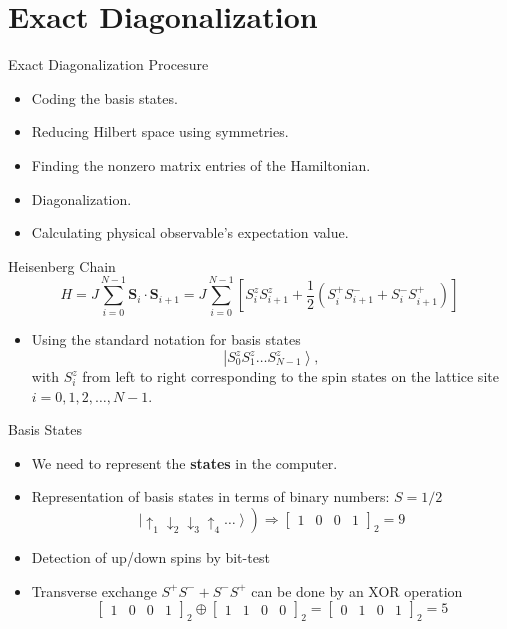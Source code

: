 \documentclass{beamer}
\begin{document}
\section{Exact Diagonalization}
\begin{frame}{Exact Diagonalization Procesure}
    \begin{itemize}
        \item Coding the basis states.
        \item Reducing Hilbert space using symmetries.
        \item Finding the nonzero matrix entries of the Hamiltonian.
        \item Diagonalization.
        \item Calculating physical observable's expectation value.
    \end{itemize}
\end{frame}
\begin{frame}{Heisenberg Chain}
$$
        H=J \sum_{i=0}^{N-1} \mathbf{S}_i \cdot \mathbf{S}_{i+1}=J \sum_{i=0}^{N-1}\left[S_i^z S_{i+1}^z+\frac{1}{2}\left(S_i^{+} S_{i+1}^{-}+S_i^{-} S_{i+1}^{+}\right)\right]
$$
    \begin{itemize}
    \item Using the standard notation for basis states 
    $$
    \left|S_0^z S_1^z \ldots S_{N-1}^z\right\rangle,
    $$
    with $S_i^z$ from left to right corresponding to the spin states on the lattice site $i=0,1,2,\ldots, N-1$.
    \end{itemize}
\end{frame}
\begin{frame}{Basis States}
    \begin{itemize}
        \item We need to represent the \textbf{states} in the computer.
        \item Representation of basis states in terms of binary numbers: $S=1/2$
$$
\left.\left|\uparrow_1 \downarrow_2 \downarrow_3 \uparrow_4 \ldots\right\rangle\right) \Rightarrow\left[\begin{array}{llll}
1 & 0 & 0 & 1
\end{array}\right]_2=9
$$
\item Detection of up/down spins by bit-test
\item Transverse exchange $S^{+} S^{-}+S^{-} S^{+}$ can be done by an XOR operation
$$
\left[\begin{array}{llll}
1 & 0 & 0 & 1
\end{array}\right]_2 \oplus\left[\begin{array}{llll}
1 & 1 & 0 & 0
\end{array}\right]_2=\left[\begin{array}{llll}
0 & 1 & 0 & 1
\end{array}\right]_2=5
$$


    \end{itemize}

\end{frame}
\end{document}
